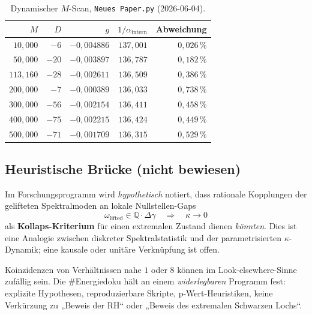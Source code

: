 \begin{table}[ht]
  \centering
  \caption{Dynamischer $M$-Scan, \texttt{Neues Paper.py} (2026-06-04).}
  \label{tab:eabc-m-scan}
  \begin{tabular}{rrrrr}
    \hline
    $M$ & $D$ & $g$ & $1/\alpha_{\mathrm{intern}}$ & Abweichung \\
    \hline
    $10{,}000$ & $-6$ & $-0{,}004886$ & $137{,}001$ & $0{,}026\,\%$ \\
    $50{,}000$ & $-20$ & $-0{,}003897$ & $136{,}787$ & $0{,}182\,\%$ \\
    $113{,}160$ & $-28$ & $-0{,}002611$ & $136{,}509$ & $0{,}386\,\%$ \\
    $200{,}000$ & $-7$ & $-0{,}000389$ & $136{,}033$ & $0{,}738\,\%$ \\
    $300{,}000$ & $-56$ & $-0{,}002154$ & $136{,}411$ & $0{,}458\,\%$ \\
    $400{,}000$ & $-75$ & $-0{,}002215$ & $136{,}424$ & $0{,}449\,\%$ \\
    $500{,}000$ & $-71$ & $-0{,}001709$ & $136{,}315$ & $0{,}529\,\%$ \\
    \hline
  \end{tabular}
\end{table}

\subsection{Heuristische Brücke (nicht bewiesen)}

Im Forschungsprogramm wird \emph{hypothetisch} notiert, dass rationale Kopplungen der gelifteten Spektralmoden an lokale Nullstellen-Gaps
\[
  \omega_{\mathrm{lifted}} \in \mathbb{Q}\cdot \Delta\gamma
  \quad\Longrightarrow\quad
  \kappa \to 0
\]
als \textbf{Kollaps-Kriterium} für einen extremalen Zustand dienen \emph{könnten}. Dies ist eine Analogie zwischen diskreter Spektralstatistik und der parametrisierten $\kappa$-Dynamik; eine kausale oder unitäre Verknüpfung ist offen.

\begin{remark}
Koinzidenzen von Verhältnissen nahe $1$ oder $8$ können im Look-elsewhere-Sinne zufällig sein. Die \#Energiedoku hält an einem \emph{widerlegbaren} Programm fest: explizite Hypothesen, reproduzierbare Skripte, p-Wert-Heuristiken, keine Verkürzung zu „Beweis der RH“ oder „Beweis des extremalen Schwarzen Lochs“.
\end{remark}
